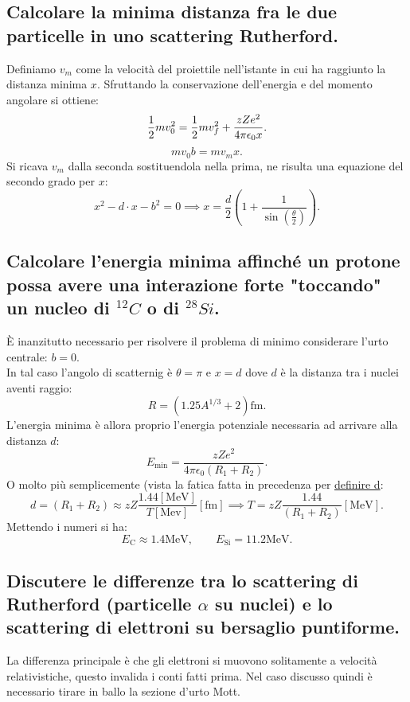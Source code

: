 \subsection[]{Calcolare la minima distanza fra le due particelle in uno scattering Rutherford.}
Definiamo $v_m$ come la velocità del proiettile nell'istante in cui ha raggiunto la distanza minima $x$. Sfruttando la conservazione dell'energia e del momento angolare si ottiene:
\[	
	\frac{1}{2}m v_0^2 = \frac{1}{2} m v_f^2 + \frac{zZe^2}{4 \pi \epsilon_0 x}\\
.\] 
\[
	mv_0b = m v_m x
.\]
Si ricava $v_m$ dalla seconda sostituendola nella prima, ne risulta una equazione del secondo grado per $x$:
 \[
	 x^2 - d \cdot x - b^2 = 0 \implies x = \frac{d}{2} \left( 1 + \frac{1}{\sin\left( \frac{\theta}{2} \right) } \right) 
.\] 
\subsection[]{Calcolare l'energia minima affinché un protone possa avere una interazione forte "toccando" un nucleo di ${}^{12}C$ o di ${}^{28} Si$.}
È inanzitutto necessario per risolvere il problema di minimo considerare l'urto centrale: $b = 0$.\\ 
In tal caso l'angolo di scatternig è $\theta = \pi$ e $x = d$ dove $d$ è la distanza tra i nuclei aventi raggio:
\[
	R = \left( 1.25 A^{1 /3} + 2 \right) \text{fm} 
.\] 
L'energia minima è allora proprio l'energia potenziale necessaria ad arrivare alla distanza $d$:
 \[
	 E_{\text{min}} = \frac{zZe^2}{4 \pi \epsilon_0 \left( R_1 + R_2 \right) } 
.\] 
O molto più semplicemente (vista la fatica fatta in precedenza per \hyperref[eq:d-rutherford]{definire d}:
\[
	d = \left( R_1 + R_2 \right) \approx zZ\frac{1.44 [\text{MeV}]}{T[\text{Mev}] } [\text{fm}] \implies T = zZ\frac{1.44}{\left( R_1+R_2\right) } [\text{MeV}]
.\] 
Mettendo i numeri si ha:
\[
E_{\text{C}} \approx 1.4 \text{MeV} ,\quad \quad 
E_{\text{Si}} = 11.2 \text{MeV}
.\] 

\subsection[]{Discutere le differenze tra lo scattering di Rutherford (particelle $\alpha$ su nuclei) e lo scattering di elettroni su bersaglio puntiforme.}
La differenza principale è che gli elettroni si muovono solitamente a velocità relativistiche, questo invalida i conti fatti prima. Nel caso discusso quindi è necessario tirare in ballo la sezione d'urto Mott.

